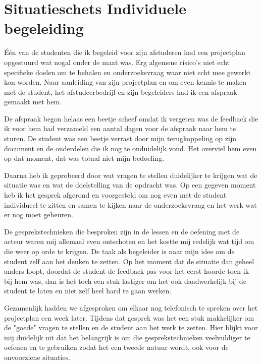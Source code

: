 
\section{Situatieschets Individuele begeleiding}
\label{sec:individu}
Één van de studenten die ik begeleid voor zijn afstuderen had een projectplan opgestuurd wat nogal onder de maat was. Erg algemene risico's niet echt specifieke doelen om te behalen en onderzoeksvraag waar niet echt mee gewerkt kon worden. Naar aanleiding van zijn projectplan en om even kennis te maken met de student, het afstudeerbedrijf en zijn begeleiders had ik een afspraak gemaakt met hem.

De afspraak begon helaas een beetje scheef omdat ik vergeten was de feedback die ik voor hem had verzameld een aantal dagen voor de afspraak naar hem te sturen. De student was een beetje verrast door mijn terugkoppeling op zijn document en de onderdelen die ik nog te onduidelijk vond. Het overviel hem even op dat moment, dat was totaal niet mijn bedoeling. 

Daarna heb ik geprobeerd door wat vragen te stellen duidelijker te krijgen wat de situatie was en wat de doelstelling van de opdracht was. Op een gegeven moment heb ik het gesprek afgerond en voorgesteld om nog even met de student individueel te zitten en samen te kijken naar de onderzoeksvraag en het werk wat er nog moet gebeuren.

De gesprekstechnieken die besproken zijn in de lessen en de oefening met de acteur waren mij allemaal even ontschoten en het kostte mij redelijk wat tijd om die weer op orde te krijgen. De taak als begeleider is naar mijn idee om de student zelf aan het denken te zetten. Op het moment dat de situatie dan geheel anders loopt, doordat de student de feedback pas voor het eerst hoorde toen ik bij hem was, dan is het toch een stuk lastiger om het ook daadwerkelijk bij de student te laten en niet zelf heel hard te gaan werken. 

Gezamenlijk hadden we afgesproken om elkaar nog telefonisch te spreken over het projectplan een week later. Tijdens dat gesprek was het een stuk makkelijker om de "goede" vragen te stellen en de student aan het werk te zetten. Hier blijkt voor mij duidelijk uit dat het belangrijk is om die gesprekstechnieken veelvuldiger te oefenen en te gebruiken zodat het een tweede natuur wordt, ook voor de onvoorziene situaties.
